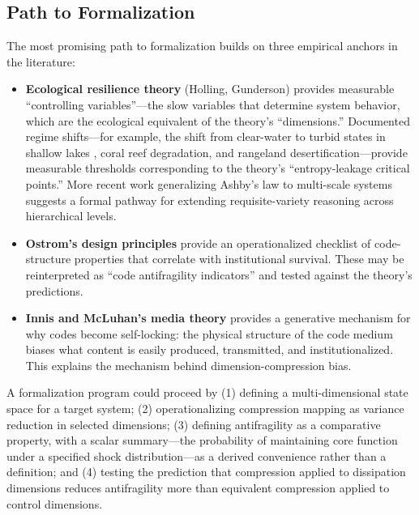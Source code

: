 \documentclass[11pt,a4paper]{article}
\begin{document}
\subsection{Path to Formalization}

The most promising path to formalization builds on three empirical anchors in the literature:

\begin{itemize}
    \item \textbf{Ecological resilience theory} (Holling, Gunderson) provides measurable ``controlling variables''---the slow variables that determine system behavior, which are the ecological equivalent of the theory's ``dimensions.'' Documented regime shifts---for example, the shift from clear-water to turbid states in shallow lakes \citep{scheffer2001}, coral reef degradation, and rangeland desertification---provide measurable thresholds corresponding to the theory's ``entropy-leakage critical points.'' More recent work generalizing Ashby's law to multi-scale systems \citep{siegenfeld2025} suggests a formal pathway for extending requisite-variety reasoning across hierarchical levels.

    \item \textbf{Ostrom's design principles} \citep{ostrom1990} provide an operationalized checklist of code-structure properties that correlate with institutional survival. These may be reinterpreted as ``code antifragility indicators'' and tested against the theory's predictions.

    \item \textbf{Innis and McLuhan's media theory} \citep{innis1951, mcluhan1964} provides a generative mechanism for why codes become self-locking: the physical structure of the code medium biases what content is easily produced, transmitted, and institutionalized. This explains the mechanism behind dimension-compression bias.
\end{itemize}

A formalization program could proceed by (1) defining a multi-dimensional state space for a target system; (2) operationalizing compression mapping as variance reduction in selected dimensions; (3) defining antifragility as a comparative property, with a scalar summary---the probability of maintaining core function under a specified shock distribution---as a derived convenience rather than a definition; and (4) testing the prediction that compression applied to dissipation dimensions reduces antifragility more than equivalent compression applied to control dimensions.
\end{document}
